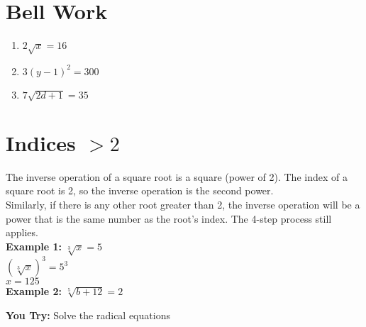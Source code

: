 \documentclass[12pt]{article}
\begin{document}
\pagebreak

\section*{Bell Work}

\begin{enumerate}
\item $2\sqrt{x}=16$\\

\vspace{1in}

\item $3(y-1)^2=300$\\

\vspace{1in}

\item $7\sqrt{2d+1}=35$
\end{enumerate}

\pagebreak

\section{Indices $>2$}

The inverse operation of a square root is a square (power of 2). The index of a square root is 2, so the inverse operation is the second power.\\

Similarly, if there is any other root greater than 2, the inverse operation will be a power that is the same number as the root's index. The 4-step process still applies.\\

\textbf{Example 1:} $\sqrt[3]{x}=5$\\

$\left(\sqrt[3]{x}\right)^3=5^3$\\ $x=125$\\

\textbf{Example 2:} $\sqrt[5]{b+12}=2$\\

	\vspace{1in}

\textbf{You Try:} Solve the radical equations\\
\end{document}
